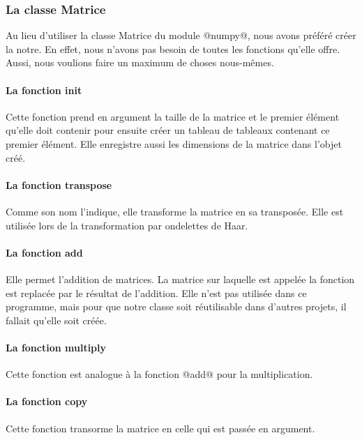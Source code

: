 \documentclass{article}
\begin{document}
\subsubsection{La classe Matrice }

Au lieu d'utiliser la classe Matrice du module @numpy@, nous avons préféré créer la notre. En effet, nous n'avons pas besoin de toutes les fonctions qu'elle offre. Aussi, nous voulions faire un maximum de choses nous-mêmes.

\paragraph{La fonction init }

Cette fonction prend en argument la taille de la matrice et le premier élément qu'elle doit contenir pour ensuite créer un tableau de tableaux contenant ce premier élément. Elle enregistre aussi les dimensions de la matrice dans l'objet créé.

\paragraph{La fonction transpose }

Comme son nom l'indique, elle transforme la matrice en sa transposée. Elle est utilisée lors de la transformation par ondelettes de Haar.

\paragraph{La fonction add}

Elle permet l'addition de matrices. La matrice sur laquelle est appelée la fonction est replacée par le résultat de l'addition. Elle n'est pas utilisée dans ce programme, mais pour que notre classe soit réutilisable dans d'autres projets, il fallait qu'elle soit créée.

\paragraph{La fonction multiply}

Cette fonction est analogue à la fonction @add@ pour la multiplication.

\paragraph{La fonction copy}

Cette fonction transorme la matrice en celle qui est passée en argument.
\end{document}
